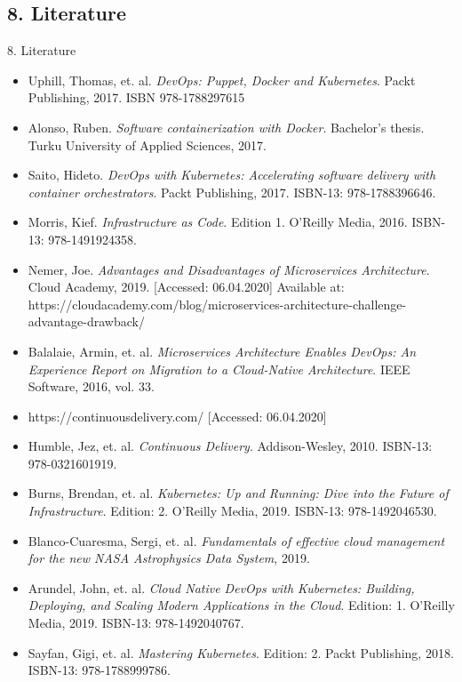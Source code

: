 \documentclass{beamer}
\begin{document}
\subsection{8. Literature}
\begin{frame}{8. Literature}%
	\tiny{
\begin{itemize}
	\item Uphill, Thomas, et. al. \textit{DevOps: Puppet, Docker and Kubernetes}. Packt Publishing, 2017. ISBN 978-1788297615
	\item Alonso, Ruben. \textit{Software containerization with Docker}. Bachelor's thesis. Turku University of Applied Sciences, 2017.
	\item Saito, Hideto. \textit{DevOps with Kubernetes: Accelerating software delivery with container orchestrators}. Packt Publishing, 2017. ISBN-13: 978-1788396646.
	\item Morris, Kief. \textit{Infrastructure as Code}. Edition 1. O'Reilly Media, 2016. ISBN-13: 978-1491924358.
	\item Nemer, Joe. \textit{Advantages and Disadvantages of Microservices Architecture}. Cloud Academy, 2019. [Accessed: 06.04.2020] Available at: https://cloudacademy.com/blog/microservices-architecture-challenge-advantage-drawback/
	\item Balalaie, Armin, et. al. \textit{Microservices Architecture Enables DevOps: An Experience Report on Migration to a Cloud-Native Architecture}. IEEE Software, 2016, vol. 33.
	\item https://continuousdelivery.com/ [Accessed: 06.04.2020]
	\item Humble, Jez, et. al. \textit{Continuous Delivery}. Addison-Wesley, 2010. ISBN-13: 978-0321601919.
	\item Burns, Brendan, et. al. \textit{Kubernetes: Up and Running: Dive into the Future of Infrastructure}. Edition: 2. O'Reilly Media, 2019. ISBN-13: 978-1492046530.
	\item Blanco-Cuaresma, Sergi, et. al. \textit{Fundamentals of effective cloud management for the new NASA Astrophysics Data System}, 2019.
	\item Arundel, John, et. al. \textit{Cloud Native DevOps with Kubernetes: Building, Deploying, and Scaling Modern Applications in the Cloud}. Edition: 1. O'Reilly Media, 2019. ISBN-13: 978-1492040767.
	\item Sayfan, Gigi, et. al. \textit{Mastering Kubernetes}. Edition: 2.  Packt Publishing, 2018. ISBN-13: 978-1788999786.
\end{itemize}
	}
\end{frame}
\end{document}
